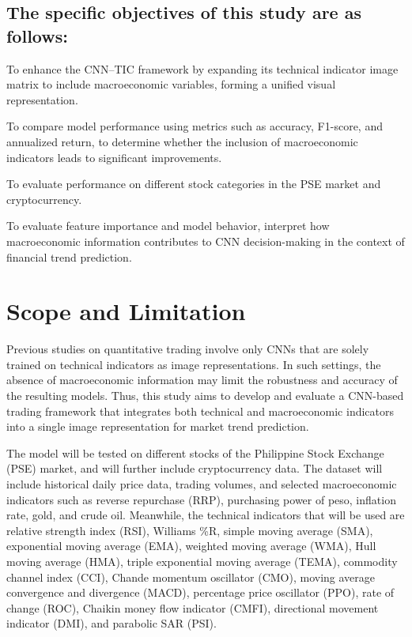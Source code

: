\documentclass[12pt,a4paper]{article}
\begin{document}
\subsection{The specific objectives of this study are as follows:}
\begin{steps}
  \item To enhance the CNN--TIC framework by expanding its technical indicator image matrix to include macroeconomic variables, forming a unified visual representation.
  \item To compare model performance using metrics such as accuracy, F1-score, and annualized return, to determine whether the inclusion of macroeconomic indicators leads to significant improvements.
  \item To evaluate performance on different stock categories in the PSE market and cryptocurrency.
  \item To evaluate feature importance and model behavior, interpret how macroeconomic information contributes to CNN decision-making in the context of financial trend prediction.
\end{steps}
\section{Scope and Limitation}
Previous studies on quantitative trading involve only CNNs that are solely trained on technical indicators
as image representations. In such settings, the absence of macroeconomic information may limit the robustness and accuracy of the resulting models. Thus, this study aims to develop and evaluate a CNN-based trading framework that integrates both technical and macroeconomic indicators into a
single image representation for market trend prediction.

The model will be tested on different stocks of the Philippine Stock Exchange (PSE) market, and will further include cryptocurrency data. The dataset will include historical daily price data, trading volumes, and selected
macroeconomic indicators such as reverse repurchase (RRP), purchasing power of peso, inflation rate, gold, and crude oil. Meanwhile, the technical indicators that will be used are relative strength index
(RSI), Williams \%R, simple moving average (SMA), exponential moving average (EMA), weighted moving average
(WMA), Hull moving average (HMA), triple exponential moving average (TEMA), commodity channel index (CCI),
Chande momentum oscillator (CMO), moving average convergence and divergence (MACD), percentage price
oscillator (PPO), rate of change (ROC), Chaikin money flow indicator (CMFI), directional movement indicator
(DMI), and parabolic SAR (PSI).
\end{document}
